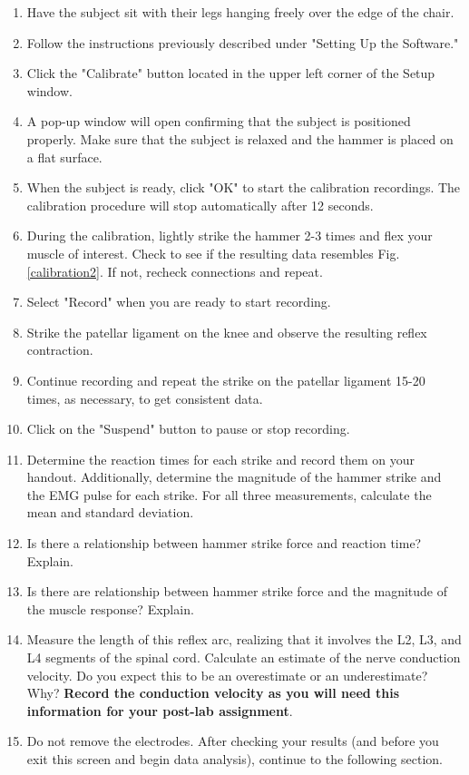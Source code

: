 \documentclass{article}
\begin{document}
\begin{enumerate}
	\item Have the subject sit with their legs hanging freely over the edge of the chair.
	\item Follow the instructions previously described under "Setting Up the Software."
	\item Click the "Calibrate" button located in the upper left corner of the Setup window.
	\item A pop-up window will open confirming that the subject is positioned properly. Make sure that the subject is relaxed and the hammer is placed on a flat surface.
	\item When the subject is ready, click "OK" to start the calibration recordings. The calibration procedure will stop automatically after 12 seconds.
	\item During the calibration, lightly strike the hammer 2-3 times and flex your muscle of interest. Check to see if the resulting data resembles Fig. \ref{calibration2}. If not, recheck connections and repeat.
	\item Select "Record" when you are ready to start recording.
	\item Strike the patellar ligament on the knee and observe the resulting reflex contraction.
	\item Continue recording and repeat the strike on the patellar ligament 15-20 times, as necessary, to get consistent data.
	\item Click on the "Suspend" button to pause or stop recording.
	\item Determine the reaction times for each strike and record them on your handout. Additionally, determine the magnitude of the hammer strike and the EMG pulse for each strike. For all three measurements, calculate the mean and standard deviation.
	\item Is there a relationship between hammer strike force and reaction time? Explain.
	\item Is there are relationship between hammer strike force and the magnitude of the muscle response? Explain.
	\item Measure the length of this reflex arc, realizing that it involves the L2, L3, and L4 segments of the spinal cord. Calculate an estimate of the nerve conduction velocity. Do you expect this to be an overestimate or an underestimate? Why? \textbf{Record the conduction velocity as you will need this information for your post-lab assignment}.
	\item Do not remove the electrodes. After checking your results (and before you exit this screen and begin data analysis), continue to the following section.
\end{enumerate}
\end{document}
